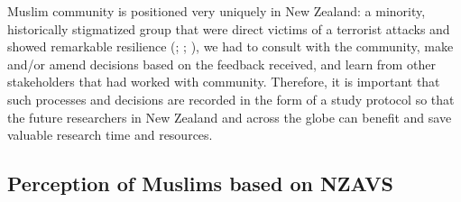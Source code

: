 \documentclass[
  man,
  longtable,
  nolmodern,
  notxfonts,
  notimes,
  colorlinks=true,linkcolor=blue,citecolor=blue,urlcolor=blue]{apa7}
\begin{document}
Muslim community is positioned very uniquely in New Zealand: a minority,
historically stigmatized group that were direct victims of a terrorist
attacks and showed remarkable resilience (; ; ), we had to consult with the community, make and/or amend
decisions based on the feedback received, and learn from other
stakeholders that had worked with community. Therefore, it is important
that such processes and decisions are recorded in the form of a study
protocol so that the future researchers in New Zealand and across the
globe can benefit and save valuable research time and resources.

\subsection{Perception of Muslims based on
NZAVS}\label{perception-of-muslims-based-on-nzavs}
\end{document}
